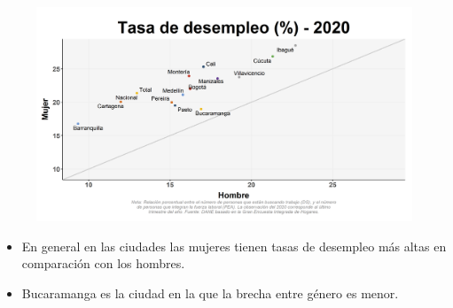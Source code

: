     \begin{figure}[H]
        \caption[Tasa de desempleo por ciudades por género para 2020 ]{\label{desemp_gen_ciudad_scatter} }
        \begin{center}
        \includegraphics[width=\textwidth,keepaspectratio]{img/var_44_scatter.png}
        \end{center}
    \end{figure}
            \begin{itemize}
                \item En general en las ciudades las mujeres tienen tasas de desempleo más altas en comparación con los hombres.
                \item Bucaramanga es la ciudad en la que la brecha entre género es menor.
                \end{itemize}

